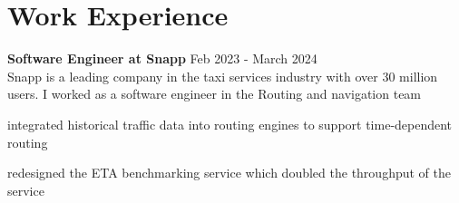 
\section{Work Experience}
\textbf{Software Engineer at Snapp} \hfill Feb 2023 - March 2024  \\
Snapp is a leading company in the taxi services industry with over 30 million users. I worked as a software engineer in the Routing and navigation team 
\begin{compactitem} 
\item integrated historical traffic data into routing engines to support time-dependent routing
\item redesigned the ETA benchmarking service which doubled the throughput of the service 
\end{compactitem} 
